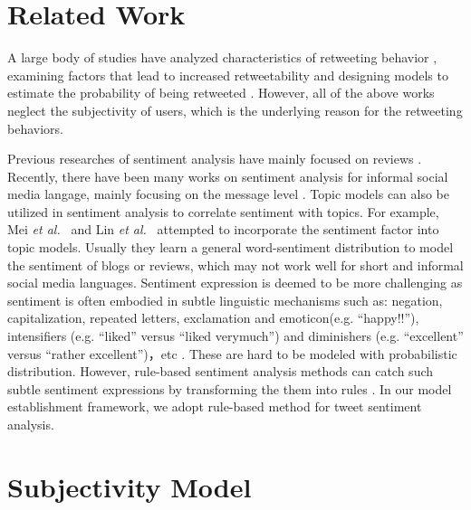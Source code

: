 \documentclass[letterpaper]{article}
\begin{document}
\section{Related Work}
\label{relatedwork}
   
A large body of studies have analyzed characteristics of retweeting behavior \cite{Bian2014,Luo:2013RMF}, examining factors that lead to increased retweetability \cite{suh2010want,comarela2012understanding} and designing models to estimate the probability of being retweeted \cite{jenders2013analyzing,pfitzner2012emotional}. However, all of the above works neglect the subjectivity of users, which is the underlying reason for the retweeting behaviors. 

Previous researches of sentiment analysis have mainly focused on reviews \cite{liu2012sentiment}. 
Recently, there have been many works on sentiment analysis for informal social media langage, mainly focusing on the message level \cite{jiang2011target,tan2011user,Guerra2014}. Topic models can also be utilized in sentiment analysis to correlate sentiment with topics. For example, Mei \emph{et al.}~\cite{mei2007topic} and Lin \emph{et al.}~\cite{lin2009joint} attempted to incorporate the sentiment factor into topic models. Usually they learn a general word-sentiment distribution to model the sentiment of blogs or reviews, which may not work well for short and informal social media languages. Sentiment expression is deemed to be more challenging as sentiment is often embodied in subtle linguistic mechanisms such as: negation, capitalization, repeated letters, exclamation and emoticon(e.g. ``happy!!''), intensifiers (e.g. ``liked'' versus ``liked verymuch'') and diminishers (e.g. ``excellent'' versus ``rather excellent'')，etc \cite{brody2011col}. These are hard to be modeled with probabilistic distribution. However, rule-based sentiment analysis methods can catch such subtle sentiment expressions by transforming the them into rules \cite{thelwall2010sentiment}. In our model establishment framework, we adopt rule-based method for tweet sentiment analysis.

\section{Subjectivity Model}
\label{subjectivemodel}
\end{document}
